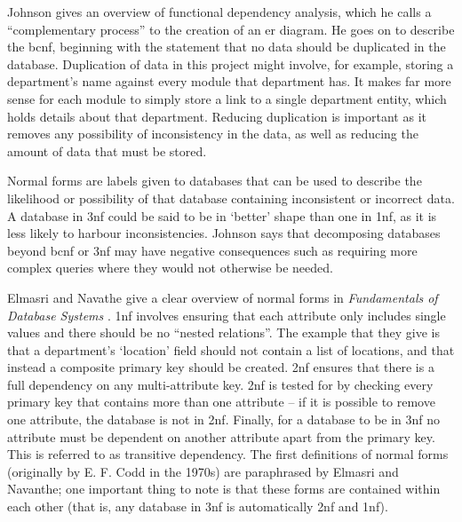 Johnson gives an overview of functional dependency analysis, which he calls a
``complementary process'' to the creation of an \gls{er} diagram. He goes on
to describe the \gls{bcnf}, beginning with the statement that no data should
be duplicated in the database. Duplication of data in this project might
involve, for example, storing a department's name against every module that
department has. It makes far more sense for each module to simply store a link
to a single department entity, which holds details about that department.
Reducing duplication is important as it removes any possibility of
inconsistency in the data, as well as reducing the amount of data that must be
stored.

Normal forms are labels given to databases that can be used to describe the
likelihood or possibility of that database containing inconsistent or
incorrect data. A database in \gls{3nf} could be said to be in `better' shape
than one in \gls{1nf}, as it is less likely to harbour inconsistencies.
Johnson says that decomposing databases beyond \gls{bcnf} or \gls{3nf} may
have negative consequences such as requiring more complex queries where they
would not otherwise be needed.

Elmasri and Navathe give a clear overview of normal forms in
\emph{Fundamentals of Database Systems} \cite{ElmasriFundamentals_2004}.
\Gls{1nf} involves ensuring that each attribute only includes single values
and there should be no ``nested relations''. The example that they give is
that a department's `location' field should not contain a list of locations,
and that instead a composite primary key should be created. \Gls{2nf} ensures
that there is a full dependency on any multi-attribute key. \Gls{2nf} is
tested for by checking every primary key that contains more than one attribute
-- if it is possible to remove one attribute, the database is not in
\gls{2nf}. Finally, for a database to be in \gls{3nf} no attribute must be
dependent on another attribute apart from the primary key. This is referred to
as transitive dependency. The first definitions of normal forms (originally by
E. F. Codd in the 1970s) are paraphrased by Elmasri and Navanthe; one
important thing to note is that these forms are contained within each other
(that is, any database in \gls{3nf} is automatically \gls{2nf} and \gls{1nf}).
